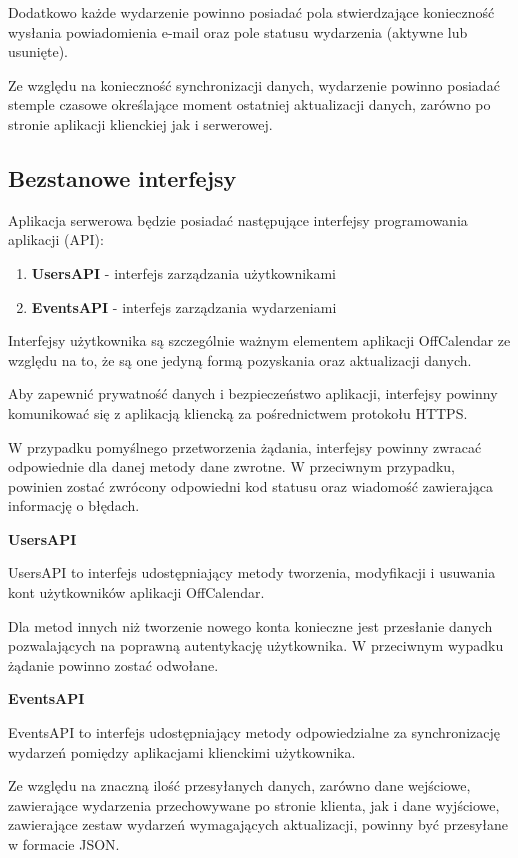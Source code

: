 Dodatkowo każde wydarzenie powinno posiadać pola stwierdzające konieczność wysłania powiadomienia e-mail oraz pole statusu wydarzenia (aktywne lub usunięte). 

Ze względu na konieczność synchronizacji danych, wydarzenie powinno posiadać stemple czasowe określające moment ostatniej aktualizacji danych, zarówno po stronie aplikacji klienckiej jak i serwerowej.

\subsection{Bezstanowe interfejsy}
\label{bezstanoweInter}

Aplikacja serwerowa będzie posiadać następujące interfejsy programowania aplikacji (API):

\begin{enumerate}
\item \textbf{UsersAPI} - interfejs zarządzania użytkownikami
\item \textbf{EventsAPI} - interfejs zarządzania wydarzeniami
\end{enumerate}

Interfejsy użytkownika są szczególnie ważnym elementem aplikacji OffCalendar ze względu na to, że są one jedyną formą pozyskania oraz aktualizacji danych. 

Aby zapewnić prywatność danych i bezpieczeństwo aplikacji, interfejsy powinny komunikować się z aplikacją kliencką za pośrednictwem protokołu HTTPS\cite{https}.

W przypadku pomyślnego przetworzenia żądania, interfejsy powinny zwracać odpowiednie dla danej metody dane zwrotne. W przeciwnym przypadku, powinien zostać zwrócony odpowiedni kod statusu oraz wiadomość zawierająca informację o błędach.

\textbf{UsersAPI}

UsersAPI to interfejs udostępniający metody tworzenia, modyfikacji i usuwania kont użytkowników aplikacji OffCalendar.

Dla metod innych niż tworzenie nowego konta konieczne jest przesłanie danych pozwalających na poprawną autentykację użytkownika. W przeciwnym wypadku żądanie powinno zostać odwołane.

\textbf{EventsAPI}

EventsAPI to interfejs udostępniający metody odpowiedzialne za synchronizację wydarzeń pomiędzy aplikacjami klienckimi użytkownika.

Ze względu na znaczną ilość przesyłanych danych, zarówno dane wejściowe, zawierające wydarzenia przechowywane po stronie klienta, jak i dane wyjściowe, zawierające zestaw wydarzeń wymagających aktualizacji, powinny być przesyłane w formacie JSON.

